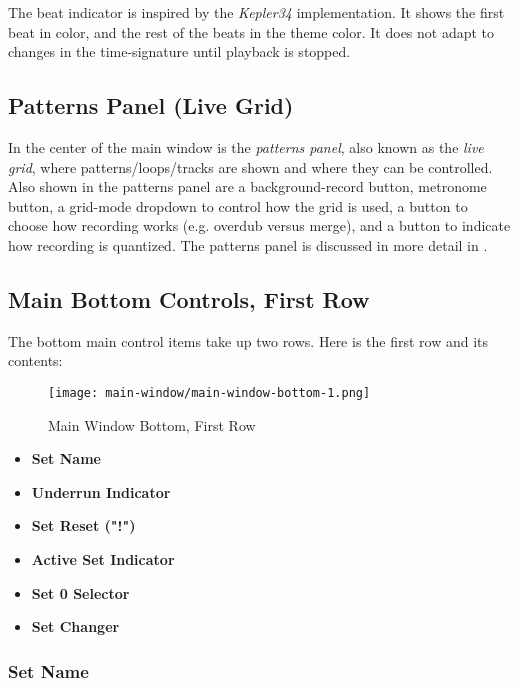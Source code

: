    The beat indicator is inspired by the \textsl{Kepler34} implementation.
   It shows the first beat in color, and the rest of the beats in the theme
   color.
   It does not adapt to changes in the time-signature until
   playback is stopped.

\subsection{Patterns Panel (Live Grid)}
\label{subsec:introduction_main_live_grid}

   In the center of the main window is the \textsl{patterns panel}, also 
   known as the \textsl{live grid}, where patterns/loops/tracks are shown
   and where they can be controlled.
   Also shown in the patterns panel are a
   background-record button, metronome button, a
   grid-mode dropdown to control how the grid is used,
   a button to choose how recording works (e.g. overdub versus merge), and
   a button to indicate how recording is quantized.
   The patterns panel is discussed in more detail in
   .

\subsection{Main Bottom Controls, First Row}
\label{subsec:introduction_main_bottom_controls}

   The bottom main control items take up two rows.
   Here is the first row and its contents:

\begin{figure}[H]
   \centering 
   \texttt{[image: main-window/main-window-bottom-1.png]}
   \caption{Main Window Bottom, First Row}
   \label{fig:main_window_bottom_1}
\end{figure}

   \begin{itemize}
      \item \textbf{Set Name}
      \item \textbf{Underrun Indicator}
      \item \textbf{Set Reset ("!")}
      \item \textbf{Active Set Indicator}
      \item \textbf{Set 0 Selector}
      \item \textbf{Set Changer}
   \end{itemize}

\subsubsection{Set Name}
\label{subsubsec:introduction_set_name}

